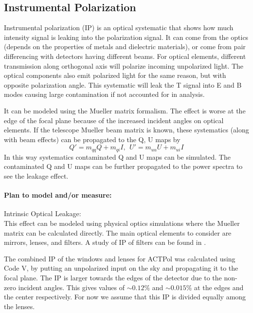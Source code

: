 \subsection{Instrumental Polarization} 
\label{instrumental_polarization}

Instrumental polarization (IP) is an optical systematic that shows how much intensity signal is leaking into the polarization signal. It can come from the optics (depends on the properties of metals and dielectric materials), or come from pair differencing with detectors having different beams. For optical elements, different transmission along orthogonal axis will polarize incoming unpolarized light. The optical components also emit polarized light for the same reason, but with opposite polarization angle.
This systematic will leak the T signal into E and B modes causing large contamination if not accounted for in analysis.

It can be modeled using the Mueller matrix formalism. The effect is worse at the edge of the focal plane because of the increased incident angles on optical elements. If the telescope Mueller beam matrix is known, these systematics (along with beam effects) can be propagated to the Q, U maps by
\begin{equation}
Q' = m_{qq} Q + m_{qi} I, \ \ U' = m_{uu} U + m_{ui} I
\end{equation}
In this way systematics contaminated Q and U maps can be simulated. The contaminated Q and U maps can be further propagated to the power spectra to see the leakage effect.

\paragraph{Plan to model and/or measure:}
\noindent Intrinsic Optical Leakage: \\
This effect can be modeled using physical optics simulations where the Mueller matrix can be calculated directly. 
The main optical elements to consider are mirrors, lenses, and filters.
A study of IP of filters can be found in \cite{pisano2005}.

The combined IP of the windows and lenses for ACTPol was calculated using Code V, 
by putting an unpolarized input on the sky and propagating it to the focal plane.
The IP is larger towards the edges of the detector due to the non-zero incident angles.
This gives values of $\sim0.12\%$ and $\sim0.015\%$ at the edges and the center respectively.
For now we assume that this IP is divided equally among the lenses.

